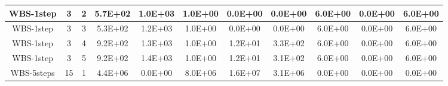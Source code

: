 \begin{table*}[]
\begin{tabular}{@{}ccccccccccc@{}}
        WBS-1step                                                & 3                                                          & 2    & 5.7E+02                                                     & 1.0E+03                                                               & 1.0E+00                                                 & 0.0E+00                                                    & 0.0E+00                                                        & 6.0E+00                                                   & 0.0E+00                                                   & 6.0E+00 \\ \midrule
        WBS-1step                                                & 3                                                          & 3    & 5.3E+02                                                     & 1.2E+03                                                               & 1.0E+00                                                 & 0.0E+00                                                    & 0.0E+00                                                        & 6.0E+00                                                   & 0.0E+00                                                   & 6.0E+00 \\ \midrule
        WBS-1step                                                & 3                                                          & 4    & 9.2E+02                                                     & 1.3E+03                                                               & 1.0E+00                                                 & 1.2E+01                                                    & 3.3E+02                                                        & 6.0E+00                                                   & 0.0E+00                                                   & 6.0E+00 \\ \midrule
        WBS-1step                                                & 3                                                          & 5    & 9.2E+02                                                     & 1.4E+03                                                               & 1.0E+00                                                 & 1.2E+01                                                    & 3.1E+02                                                        & 6.0E+00                                                   & 0.0E+00                                                   & 6.0E+00 \\ \midrule
        WBS-5steps                                               & 15                                                         & 1    & 4.4E+06                                                     & 0.0E+00                                                               & 8.0E+06                                                 & 1.6E+07                                                    & 3.1E+06                                                        & 0.0E+00                                                   & 0.0E+00                                                   & 0.0E+00 \\ \midrule

\end{tabular}
\end{table*}

